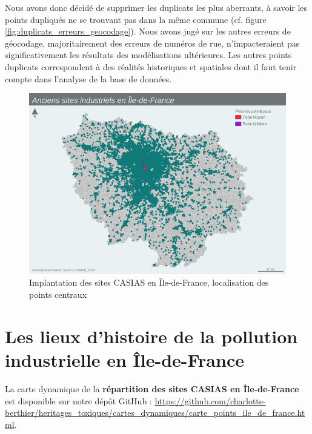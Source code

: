 \documentclass[a4paper,twoside,12pt]{book}
\begin{document}
Nous avons donc décidé de supprimer les duplicats les plus aberrants, à savoir les points dupliqués ne se trouvant pas dans la même commune (cf. figure \ref{fig:duplicats_erreurs_geocodage}). Nous avons jugé sur les autres erreurs de géocodage, majoritairement des erreurs de numéros de rue, n'impacteraient pas significativement les résultats des modélisations ultérieures. Les autres points duplicats correspondent à des réalités historiques et spatiales dont il faut tenir compte dans l'analyse de la base de données. 

\begin{landscape}
\begin{figure}[htbp]
\centering 
\hspace*{-2cm}\vspace*{+2cm}\includegraphics[width=1.35\textwidth]{img/chapitre3/CASIAS_Carte_IDF_All_Points_fixe_Moyen_Median.png}
\caption{Implantation des sites CASIAS en Île-de-France, localisation des points centraux}
\label{fig:carte_points_casias_bleue_points_centraux}
\end{figure}
\end{landscape}


\section{Les lieux d'histoire de la pollution industrielle en Île-de-France}

\begin{tcolorbox}[colback=gray!5!white,colframe=gray!20!white]
La carte dynamique de la \textbf{répartition des sites CASIAS en Île-de-France} est disponible sur notre dépôt GitHub : \url{https://github.com/charlotte-berthier/heritages_toxiques/cartes_dynamiques/carte_points_ile_de_france.html}.
\end{tcolorbox}
\end{document}
